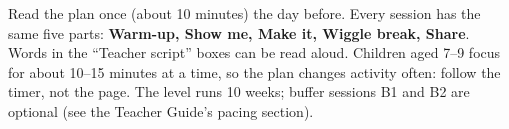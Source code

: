 \documentclass[track=junior,level=2,teacher]{kidscode}
\begin{document}

\begin{tip}
Read the plan once (about 10 minutes) the day before. Every session has the same five parts:
\textbf{Warm-up, Show me, Make it, Wiggle break, Share}. Words in the \enquote{Teacher script}
boxes can be read aloud. Children aged 7--9 focus for about 10--15 minutes at a time, so the plan
changes activity often: follow the timer, not the page. The level runs 10 weeks; buffer
sessions B1 and B2 are optional (see the Teacher Guide's pacing section).
\end{tip}
\kcweeklytoc
{}
\end{document}

